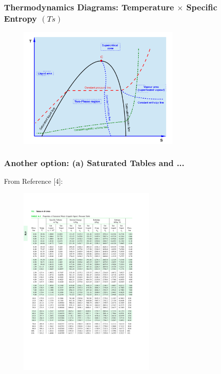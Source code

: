 \documentclass[10pt,compress]{beamer}
\begin{document}
\begin{frame}
 \frametitle{Thermodynamics Diagrams: Temperature $\times$ Specific Entropy $(Ts)$}
  \begin{center}
   \begin{figure}
      \includegraphics[width=8cm,height=7.cm,clip]{./Pics/TS_Diag_Schematics}
   \end{figure}
   \end{center}
\end{frame}

\begin{frame}
  \frametitle{Another option: (a) Saturated Tables and ...}
\scriptsize{From Reference [4]:}\vspace{-.8cm}
   \begin{center}
   \begin{figure}
      \includegraphics[width=9.cm,height=9.5cm,clip]{./Pics/WaterSatTable}
   \end{figure}
   \end{center}
\end{frame}
\end{document}
